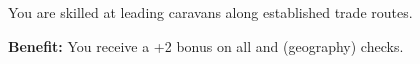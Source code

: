 
You are skilled at leading caravans along established trade routes.

\textbf{Benefit:} You receive a +2 bonus on all  and  (geography) checks.